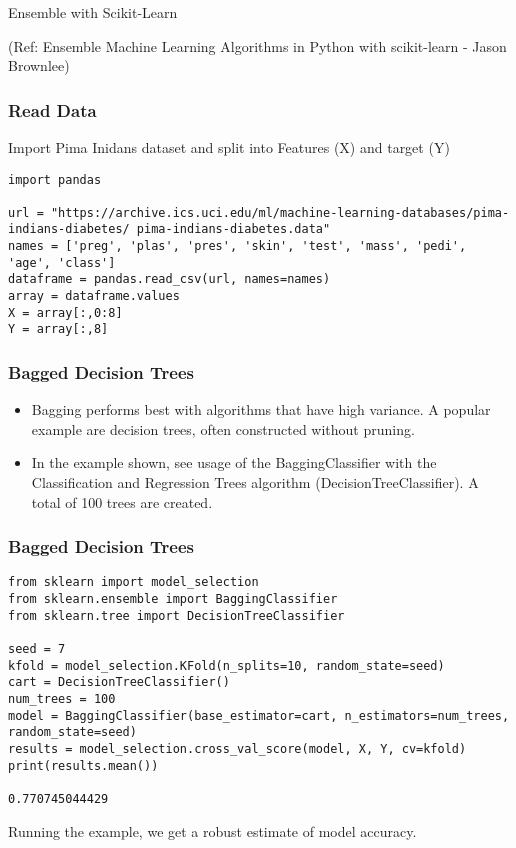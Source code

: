 \begin{frame}[fragile]\frametitle{}
\begin{center}
{\Large Ensemble with Scikit-Learn}

{\tiny (Ref: Ensemble Machine Learning Algorithms in Python with scikit-learn - Jason Brownlee)}
\end{center}
\end{frame}

\begin{frame}[fragile]\frametitle{Read Data}
Import Pima Inidans dataset and split into Features (X) and target (Y)
\begin{lstlisting}
import pandas

url = "https://archive.ics.uci.edu/ml/machine-learning-databases/pima-indians-diabetes/ pima-indians-diabetes.data"
names = ['preg', 'plas', 'pres', 'skin', 'test', 'mass', 'pedi', 'age', 'class']
dataframe = pandas.read_csv(url, names=names)
array = dataframe.values
X = array[:,0:8]
Y = array[:,8]
\end{lstlisting}
\end{frame}

\begin{frame}[fragile]\frametitle{Bagged Decision Trees}

	\begin{itemize}
	\item Bagging performs best with algorithms that have high variance. A popular example are decision trees, often constructed without pruning.
	\item In the example shown, see usage of the BaggingClassifier with the Classification and Regression Trees algorithm (DecisionTreeClassifier). A total of 100 trees are created.
	\end{itemize}
	
\end{frame}

\begin{frame}[fragile]\frametitle{Bagged Decision Trees}
\begin{lstlisting}
from sklearn import model_selection
from sklearn.ensemble import BaggingClassifier
from sklearn.tree import DecisionTreeClassifier

seed = 7
kfold = model_selection.KFold(n_splits=10, random_state=seed)
cart = DecisionTreeClassifier()
num_trees = 100
model = BaggingClassifier(base_estimator=cart, n_estimators=num_trees, random_state=seed)
results = model_selection.cross_val_score(model, X, Y, cv=kfold)
print(results.mean())

0.770745044429
\end{lstlisting}
Running the example, we get a robust estimate of model accuracy.
\end{frame}



